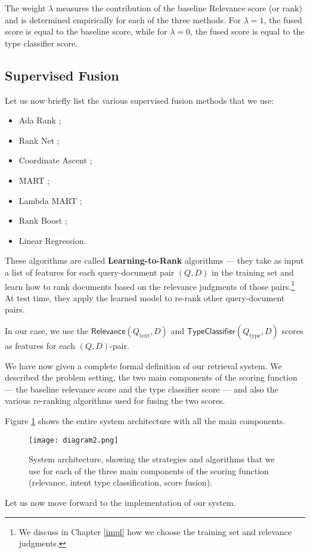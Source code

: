 The weight $\lambda$ measures the contribution of the baseline \textsf{Relevance} score (or rank) and
is determined empirically for each of the three methods. For $\lambda=1$, the fused score is equal to the baseline score,
while for $\lambda=0$, the fused score is equal to the type classifier score.

\subsection{Supervised Fusion}\label{sup-fusion}
Let us now briefly list the various supervised fusion methods that we use:
\begin{itemize}
 \item {Ada Rank} \cite{adaRank};
 \item {Rank Net} \cite{rankNet};
 \item {Coordinate Ascent} \cite{coordAscent};
 \item {MART} \cite{mart};
 \item {Lambda MART} \cite{lambda-mart};
 \item {Rank Boost} \cite{rankBoost};
  \item {Linear Regression}.
\end{itemize}

These algorithms are called \textbf{Learning-to-Rank} algorithms ---
they take as input a list of features for each query-document pair $(Q,D)$ in the training
set and learn how to rank documents based on the
relevance judgments of those pairs.\footnote{We discuss in Chapter \ref{impl} how we choose the training set and relevance judgments.}
At test time, they apply the learned model to re-rank other query-document pairs.

In our case, we use the $\textsf{Relevance}(Q_{\text{text}},D)$ and $\textsf{TypeClassifier}(Q_{\text{type}}, D)$
scores as features for each $(Q,D)$-pair.

We have now given a complete formal definition of our retrieval system. We described the problem setting,
the two main components of the scoring function --- the baseline relevance score and the type classifier score ---
and also the various re-ranking algorithms used for fusing the two scores.

Figure \ref{diagram2} shows the entire system architecture with all the main components.

\begin{figure}
\centerline{
  \texttt{[image: diagram2.png]}
  }
  \caption{System architecture, showing the strategies and algorithms that we use for each of the
  three main components of the scoring function (relevance, intent type classification, score fusion).}
  \label{diagram2}
\end{figure}

Let us now move forward to the implementation of our system.


